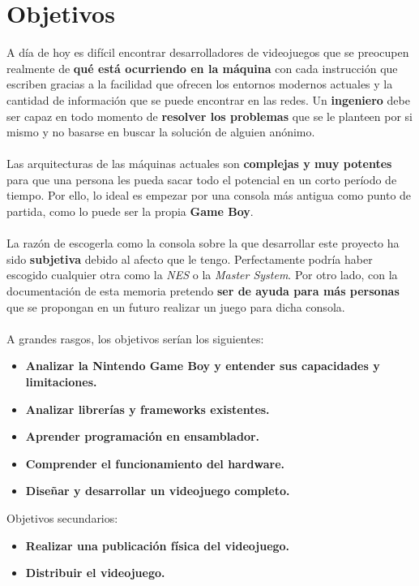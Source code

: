 \chapter{Objetivos}
\label{objetivos}

A día de hoy es difícil encontrar desarrolladores de videojuegos que se preocupen realmente de \textbf{qué está ocurriendo en la máquina} con cada instrucción que escriben gracias a la facilidad que ofrecen los entornos modernos actuales y la cantidad de información que se puede encontrar en las redes.
Un \textbf{ingeniero} debe ser capaz en todo momento de \textbf{resolver los problemas} que se le planteen por si mismo y no basarse en buscar la solución de alguien anónimo.\\ \\
Las arquitecturas de las máquinas actuales son \textbf{complejas y muy potentes} para que una persona les pueda sacar todo el potencial en un corto período de tiempo. Por ello, lo ideal es empezar por una consola más antigua como punto de partida, como lo puede ser la propia \textbf{Game Boy}.\\ \\
La razón de escogerla como la consola sobre la que desarrollar este proyecto ha sido \textbf{subjetiva} debido al afecto que le tengo. Perfectamente podría haber escogido cualquier otra como la \textit{NES} o la \textit{Master System}. Por otro lado, con la documentación de esta memoria pretendo \textbf{ser de ayuda para más personas} que se propongan en un futuro realizar un juego para dicha consola.\\ \\
A grandes rasgos, los objetivos serían los siguientes:\\
\begin{itemize}
	\item \textbf{Analizar la Nintendo Game Boy y entender sus capacidades y limitaciones.}
	\item \textbf{Analizar librerías y frameworks existentes.}
	\item \textbf{Aprender programación en ensamblador.}
	\item \textbf{Comprender el funcionamiento del hardware.}
	\item \textbf{Diseñar y desarrollar un videojuego completo.}
\end{itemize}

Objetivos secundarios:

\begin{itemize}
	\item \textbf{Realizar una publicación física del videojuego.}
	\item \textbf{Distribuir el videojuego.}
\end{itemize}


